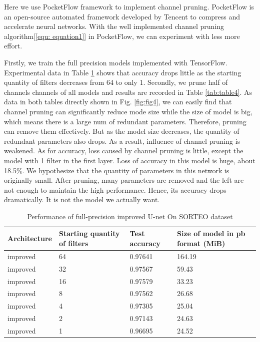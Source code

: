 \documentclass[sigconf]{acmart}
\begin{document}
Here we use PocketFlow framework\cite{pocketflow} to implement channel pruning. PocketFlow is an open-source automated framework developed by Tencent to compress and accelerate neural networks. With the well implemented channel pruning algorithm[\ref{equ: equation1}] in PocketFlow, we can experiment with less more effort.

Firstly, we train the full precision models implemented with TensorFlow. Experimental data in Table \ref{tab:table3} shows that accuracy drops little as the starting quantity of filters decreases from 64 to only 1. Secondly, we prune half of channels channels of all models and results are recorded in Table \ref{tab:table4}. As data in both tables directly shown in Fig. \ref{fig:fig4}, we can easily find that channel pruning can significantly reduce mode size while the size of model is big, which means there is a large num of redundant parameters. Therefore, pruning can remove them effectively. But as the model size decreases, the quantity of redundant parameters also drops. As a result, influence of channel pruning is weakened. As for accuracy, loss caused by channel pruning is little, except the model with 1 filter in the first layer. Loss of accuracy in this model is huge, about 18.5\%. We hypothesize that the quantity of parameters in this network is originally small. After pruning, many parameters are removed and the left are not enough to maintain the high performance. Hence, its accuracy drops dramatically. It is not the model we actually want.


\begin{table}
 \caption{Performance of full-precision improved U-net On SORTEO dataset}
  \centering
  \begin{tabular}{llll}
    \toprule
    Architecture & Starting quantity of filters & Test accuracy  & Size of model in pb format (MiB) \\
    \midrule
    improved & 64 & 0.97641 & 164.19 \\
    \midrule
    improved & 32 & 0.97567 & 59.43 \\
    \midrule
    improved & 16 & 0.97579 & 33.23 \\
    \midrule
    improved &  8 & 0.97562 & 26.68 \\
    \midrule
    improved &  4 & 0.97305 & 25.04\\
    \midrule
    improved &  2 & 0.97143 & 24.63\\
    \midrule
    improved &  1 & 0.96695 & 24.52\\
    \bottomrule
  \end{tabular}
  \label{tab:table3}
\end{table}
\end{document}
